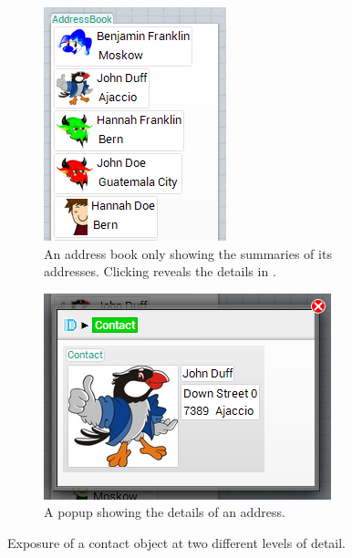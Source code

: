\documentclass[english]{scrartcl}
\begin{document}
\begin{figure}[h]
\begin{subfigure}{0.42\linewidth}
	\centering
	\includegraphics{img/AddressBook_whole.png}
	\caption[AddressBook visualization]{An address book only showing the summaries of its addresses. Clicking reveals the details in .}
\end{subfigure}
\hspace{0.03\linewidth}
\begin{subfigure}{0.55\linewidth}
	\centering
	\includegraphics{img/AddressBook_contact.png}
	\caption[Contact visualization]{A popup showing the details of an address.}
\end{subfigure}
\caption{Exposure of a contact object at two different levels of detail.}
\end{figure}
\end{document}
